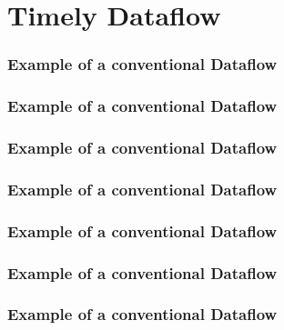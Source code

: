 \documentclass[aspectratio=169,10pt]{beamer}
\begin{document}
\section{Timely Dataflow}

\begin{frame}
  \frametitle{Example of a conventional Dataflow}
  \begin{center}
    
  \end{center}
\end{frame}

\begin{frame}
  \frametitle{Example of a conventional Dataflow}
  \begin{center}
    
  \end{center}
\end{frame}

\begin{frame}
  \frametitle{Example of a conventional Dataflow}
  \begin{center}
    
  \end{center}
\end{frame}

\begin{frame}
  \frametitle{Example of a conventional Dataflow}
  \begin{center}
    
  \end{center}
\end{frame}

\begin{frame}
  \frametitle{Example of a conventional Dataflow}
  \begin{center}
    
  \end{center}
\end{frame}

\begin{frame}
  \frametitle{Example of a conventional Dataflow}
  \begin{center}
    
  \end{center}
\end{frame}

\begin{frame}
  \frametitle{Example of a conventional Dataflow}
  \begin{center}
    
  \end{center}
\end{frame}
\end{document}
